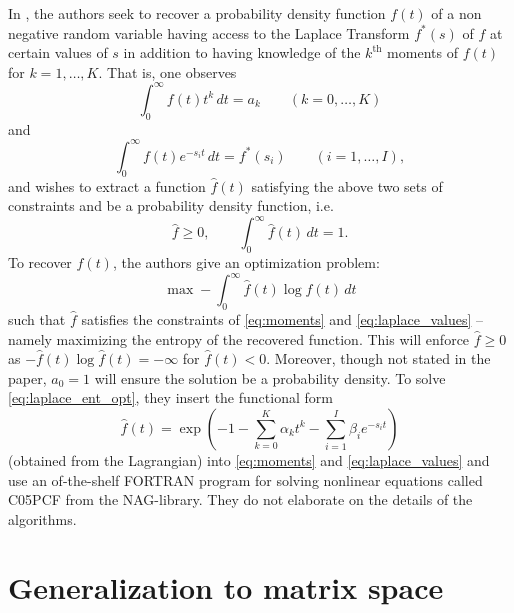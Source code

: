 \documentclass[10pt,a4paper]{article}
\numberwithin{equation}{section}
\theoremstyle{definition}
\begin{document}
    In \cite{LaplaceInv}, the authors seek to recover a probability density function $f(t)$ of a non negative random variable having access to the Laplace Transform $f^\ast(s)$ of $f$ at certain values of $s$ in addition to having knowledge of the $k^{\text{th}}$ moments of $f(t)$ for $k=1, \dots, K$. That is, one observes 
    \begin{equation}\label{eq:moments}
    \int_0^\infty f(t) t^k \,dt = a_k \qquad (k=0,\dots, K)
     \end{equation}
    and 
     \begin{equation}\label{eq:laplace_values}
    \int_0^\infty f(t) e^{-s_i t} \,dt = f^\ast(s_i) \qquad (i=1,\dots, I),
    \end{equation}
    and wishes to extract a function $\hat{f}(t)$ satisfying the above two sets of constraints and be a probability density function, i.e.
    \[
    \hat{f} \geq 0, \qquad  \int_0^\infty \hat{f}(t) \,dt = 1.
    \]
    To recover $f(t)$, the authors give an optimization problem:
    \begin{equation}\label{eq:laplace_ent_opt}
        \max  - \int_0^\infty \hat{f}(t) \log \hat{f}(t) \,dt 
    \end{equation}
    such that $\hat{f}$ satisfies the constraints of \eqref{eq:moments} and \eqref{eq:laplace_values} -- namely maximizing the entropy of the recovered function. This will enforce $\hat{f} \geq 0$ as $-  \hat{f}(t) \log \hat{f}(t) = - \infty$ for $\hat{f}(t) < 0$. Moreover, though not stated in the paper, $a_0 = 1$ will ensure the solution be a probability density. To solve \eqref{eq:laplace_ent_opt}, they insert the functional form 
    \[
    \hat{f}(t) = \exp{(-1 - \sum_{k=0}^K\alpha_k t^k - \sum_{i=1}^I \beta_i e^{-s_i t})}
    \]
    (obtained from the Lagrangian) into \eqref{eq:moments} and \eqref{eq:laplace_values} and use an of-the-shelf FORTRAN program for solving nonlinear equations called C05PCF from the NAG-library. They do not elaborate on the details of the algorithms. 
    

\section{Generalization to matrix space}
\end{document}
